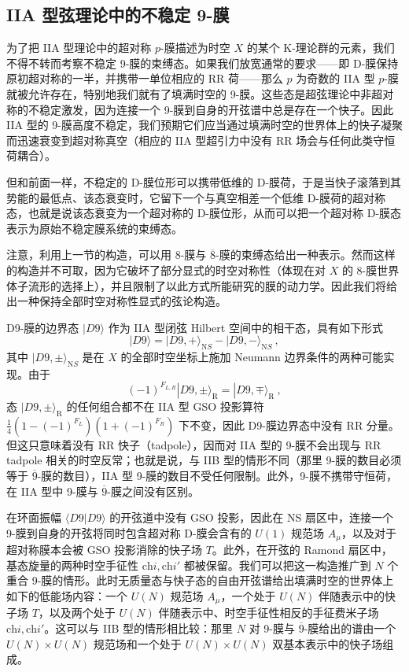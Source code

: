 \documentclass[11pt,a4paper]{ctexart}
\newcommand{\SrcRange}[2]{\marginpar{\raggedright\footnotesize 原文 p.#1}}
\begin{document}
\SrcRange{44}{44}
\subsection{IIA 型弦理论中的不稳定 9-膜}\label{iia-ux578bux5f26ux7406ux8bbaux4e2dux7684ux4e0dux7a33ux5b9a-9-ux819c}

为了把 IIA 型理论中的超对称 \(p\)-膜描述为时空 \(X\) 的某个 K-理论群的元素，我们不得不转而考察不稳定 9-膜的束缚态。如果我们放宽通常的要求------即 D-膜保持原初超对称的一半，并携带一单位相应的 RR 荷------那么 \(p\) 为奇数的 IIA 型 \(p\)-膜就被允许存在，特别地我们就有了填满时空的 9-膜。这些态是超弦理论中非超对称的不稳定激发，因为连接一个 9-膜到自身的开弦谱中总是存在一个快子。因此 IIA 型的 9-膜高度不稳定，我们预期它们应当通过填满时空的世界体上的快子凝聚而迅速衰变到超对称真空（相应的 IIA 型超引力中没有 RR 场会与任何此类守恒荷耦合）。

但和前面一样，不稳定的 D-膜位形可以携带低维的 D-膜荷，于是当快子滚落到其势能的最低点、该态衰变时，它留下一个与真空相差一个低维 D-膜荷的超对称态，也就是说该态衰变为一个超对称的 D-膜位形，从而可以把一个超对称 D-膜态表示为原始不稳定膜系统的束缚态。

注意，利用上一节的构造，可以用 8-膜与 \(\overline{8}\)-膜的束缚态给出一种表示。然而这样的构造并不可取，因为它破坏了部分显式的时空对称性（体现在对 \(X\) 的 8-膜世界体子流形的选择上），并且限制了以此方式所能研究的膜的动力学。因此我们将给出一种保持全部时空对称性显式的弦论构造。

D9-膜的边界态 \(|D9\rangle\) 作为 IIA 型闭弦 Hilbert 空间中的相干态，具有如下形式 \[|D9\rangle=|D9,+ \rangle_{{\mathrm NS}}-|D9,-\rangle_{{\mathrm NS}}\ ,\] 其中 \(|D9,\pm\rangle_{{\mathrm NS}}\) 是在 \(X\) 的全部时空坐标上施加 Neumann 边界条件的两种可能实现。由于 \[(-1)^{F_{L,R}}|D9,\pm\rangle_{{\mathrm R}}=|D9,\mp\rangle_{{\mathrm R}}\ ,\] 态 \(|D9,\pm\rangle_{{\mathrm R}}\) 的任何组合都不在 IIA 型 GSO 投影算符 \(\frac14(1-(-1)^{F_L})(1+(-1)^{F_R})\) 下不变，因此 D9-膜边界态中没有 RR 分量。但这只意味着没有 RR 快子（tadpole），因而对 IIA 型的 9-膜不会出现与 RR tadpole 相关的时空反常；也就是说，与 IIB 型的情形不同（那里 9-膜的数目必须等于 \(\overline{9}\)-膜的数目），IIA 型 9-膜的数目不受任何限制。此外，9-膜不携带守恒荷，在 IIA 型中 9-膜与 \(\overline{9}\)-膜之间没有区别。

在环面振幅 \(\langle D9|D9\rangle\) 的开弦道中没有 GSO 投影，因此在 NS 扇区中，连接一个 9-膜到自身的开弦将同时包含超对称 D-膜会含有的 \(U(1)\) 规范场 \(A_{\mu}\)，以及对于超对称膜本会被 GSO 投影消除的快子场 \(T\)。此外，在开弦的 Ramond 扇区中，基态旋量的两种时空手征性 \(\mathrm{ch}i, \mathrm{ch}i'\) 都被保留。我们可以把这一构造推广到 \(N\) 个重合 9-膜的情形。此时无质量态与快子态的自由开弦谱给出填满时空的世界体上如下的低能场内容：一个 \(U(N)\) 规范场 \(A_{\mu}\)，一个处于 \(U(N)\) 伴随表示中的快子场 \(T\)，以及两个处于 \(U(N)\) 伴随表示中、时空手征性相反的手征费米子场 \(\mathrm{ch}i,\mathrm{ch}i'\)。这可以与 IIB 型的情形相比较：那里 \(N\) 对 9-膜与 \(\overline{9}\)-膜给出的谱由一个 \(U(N)\times U(N)\) 规范场和一个处于 \(U(N)\times U(N)\) 双基本表示中的快子场组成。
\end{document}
